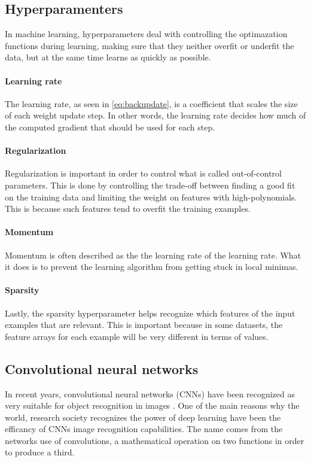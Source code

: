 \subsection{Hyperparamenters}\label{section:hyperparameters}
In machine learning, hyperparameters deal with controlling the optimazation functions during learning, making sure that they neither overfit or underfit the data, but at the same time learns as quickly as possible.

\paragraph{Learning rate}
The learning rate, as seen in \autoref{eq:backupdate}, is a coefficient that scales the size of each weight update step. In other words, the learning rate decides how much of the computed gradient that should be used for each step. 

\paragraph{Regularization}
Regularization is important in order to control what is called out-of-control parameters. This is done by controlling the trade-off between finding a good fit on the training data and limiting the weight on features with high-polynomials. This is because such features tend to overfit the training examples.

\paragraph{Momentum}
Momentum is often described as the the learning rate of the learning rate. What it does is to prevent the learning algorithm from getting stuck in local minimas.

\paragraph{Sparsity}
Lastly, the sparsity hyperparameter helps recognize which features of the input examples that are relevant. This is important because in some datasets, the feature arrays for each example will be very different in terms of values.

\subsection{Convolutional neural networks}
In recent years, convolutional neural networks (CNNs) have been recognized as very suitable for object recognition in images \cite{Patterson2017}. One of the main reasons why the world, research society recognizes the power of deep learning have been the efficancy of CNNs image recognition capabilities. The name comes from the networks use of convolutions, a mathematical operation on two functions in order to produce a third.

